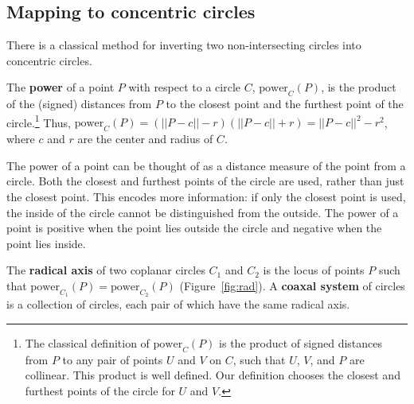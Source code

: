 
\subsection{Mapping to concentric circles}

There is a classical method for inverting two non-intersecting circles 
into concentric circles.

\begin{defn2}
\label{defn:power}
The {\bf power} of a point $P$ with respect to a circle $C$,
$\mbox{power}_{C}(P)$, is the product of the (signed) distances from
$P$ to the closest point and the furthest point 
of the circle.\footnote{The classical
	definition of $\mbox{power}_{C}(P)$ is  
	the product of signed distances from $P$ 
	to any pair of points $U$ and $V$
	on $C$, such that $U$, $V$, and $P$ are collinear.
	This product is well defined.
	Our definition chooses the closest and furthest points of the
	circle for $U$ and $V$.}
Thus, $\mbox{power}_{C}(P) = (||P-c|| - r)(||P-c|| + r)
= ||P-c||^2 - r^2$, where $c$ and $r$ are the 
center and radius of $C$.
\end{defn2}


\begin{rmk}
\label{rmk:pow}
The power of a point can be thought of as a distance measure of the point
from a circle. 
Both the closest and furthest points of the circle are used, 
rather than just the closest point.
This encodes more information: if only the closest point is used, 
the inside of the circle cannot be distinguished from the outside.
The power of a point is positive when the point lies outside the 
circle and negative when the point lies inside.


\end{rmk}

\begin{defn2}
The {\bf radical axis} of two coplanar circles $C_1$ and $C_2$
is the locus of points $P$ such that $\mbox{power}_{C_1}(P) = 
\mbox{power}_{C_2}(P)$ (Figure~\ref{fig:rad}).
A {\bf coaxal system} of circles is a collection of circles, 
each pair of which have the same radical axis.
\end{defn2}

